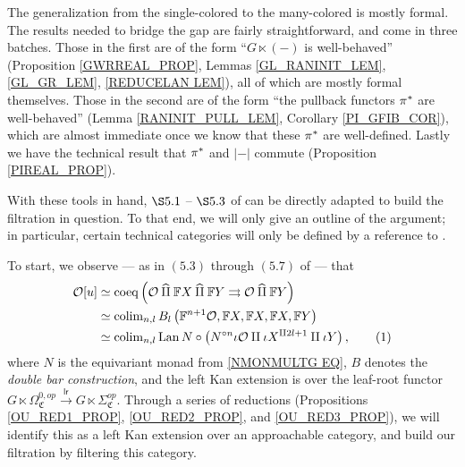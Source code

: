 \documentclass[a4paper,10pt
,draft
]{article}%
\renewcommand{\hat}{\widehat}
\renewcommand{\1}{\eta}%
\begin{document}
\begin{remark}
      The generalization from the single-colored to the many-colored is mostly formal.
      The results needed to bridge the gap are fairly straightforward, and come in three batches.
      Those in the first are of the form ``$G \ltimes (-)$ is well-behaved''
      (Proposition \ref{GWRREAL_PROP}, Lemmas \ref{GL_RANINIT_LEM}, \ref{GL_GR_LEM}, \ref{REDUCELAN LEM}),
      all of which are mostly formal themselves.
      Those in the second are of the form ``the pullback functors $\pi^{\**}$ are well-behaved''
      (Lemma \ref{RANINIT_PULL_LEM}, Corollary \ref{PI_GFIB_COR}),
      which are almost immediate once we know that these $\pi^{\**}$ are well-defined.
      Lastly we have the technical result that
      $\pi^{\**}$ and $|-|$ commute (Proposition \ref{PIREAL_PROP}).

      With these tools in hand, $\S 5.1$ -- $\S 5.3$ of \cite{BP_geo} can be directly adapted to build the filtration in question.
      To that end, we will only give an outline of the argument;
      in particular, certain technical categories will only be defined by a reference to \cite{BP_geo}.
\end{remark}


To start, we observe ---  as in $(5.3)$ through $(5.7)$ of \cite{BP_geo} --- that
\begin{align*}
  \O[u]
  &
    \simeq \mathrm{coeq}\left(
          \O \mathbin{\hat\amalg} \mathbb F X \mathbin{\hat\amalg} \mathbb F Y \rightrightarrows \O \mathbin{\hat\amalg} \mathbb F Y
          \right)
  \\
  &
    \simeq \colim_{n,l} B_l \left( \mathbb F^{n+1} \O, \mathbb F X, \mathbb F X, \mathbb F X, \mathbb FY \right)
  \\
  &
    \simeq \colim_{n,l} \Lan N \circ \left( N^{\circ n} \iota \O \amalg \iota X^{\amalg 2l +1} \amalg \iota Y \right),
    \stepcounter{equation}\tag{\theequation}\label{OU_EQ1}
\end{align*}
where $N$ is the equivariant monad from \eqref{NMONMULTG EQ},
$B$ denotes the \textit{double bar construction},
and the left Kan extension is over the leaf-root functor
\mbox{$G \ltimes \Omega_{\mathfrak C}^{0,op} \xrightarrow{\mathsf{lr}} G \ltimes \Sigma_{\mathfrak C}^{op}$}.
Through a series of reductions (Propositions \ref{OU_RED1_PROP}, \ref{OU_RED2_PROP}, and \ref{OU_RED3_PROP}),
we will identify this as a left Kan extension over an approachable category, 
and build our filtration by filtering this category.
\end{document}
